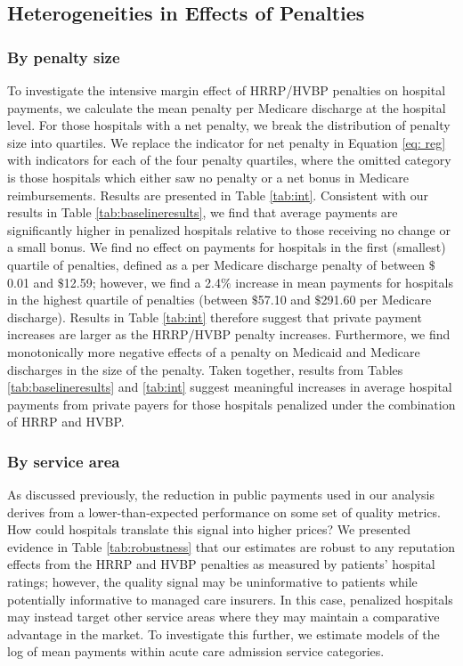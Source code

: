 \documentclass[12pt]{article}
\begin{document}
\subsection{Heterogeneities in Effects of Penalties}

\subsubsection*{By penalty size}
To investigate the intensive margin effect of HRRP/HVBP penalties on hospital payments, we calculate the mean penalty per Medicare discharge at the hospital level.  For those hospitals with a net penalty, we break the distribution of penalty size into quartiles.  We replace the indicator for net penalty in Equation \ref{eq: reg} with indicators for each of the four penalty quartiles, where the omitted category is those hospitals which either saw no penalty or a net bonus in Medicare reimbursements. Results are presented in Table \ref{tab:int}.  Consistent with our results in Table \ref{tab:baselineresults}, we find that average payments are significantly higher in penalized hospitals relative to those receiving no change or a small bonus.  We find no effect on payments for hospitals in the first (smallest) quartile of penalties, defined as a per Medicare discharge penalty of between $\$$0.01 and $\$$12.59; however, we find a 2.4$\%$ increase in mean payments for hospitals in the highest quartile of penalties (between $\$$57.10 and $\$$291.60 per Medicare discharge).  Results in Table \ref{tab:int} therefore suggest that private payment increases are larger as the HRRP/HVBP penalty increases. Furthermore, we find monotonically more negative effects of a penalty on Medicaid and Medicare discharges in the size of the penalty.  Taken together, results from Tables \ref{tab:baselineresults} and \ref{tab:int} suggest meaningful increases in average hospital payments from private payers for those hospitals penalized under the combination of HRRP and HVBP.


\subsubsection*{By service area}
As discussed previously, the reduction in public payments used in our analysis derives from a lower-than-expected performance on some set of quality metrics. How could hospitals translate this signal into higher prices? We presented evidence in Table \ref{tab:robustness} that our estimates are robust to any reputation effects from the HRRP and HVBP penalties as measured by patients' hospital ratings; however, the quality signal may be uninformative to patients while potentially informative to managed care insurers. In this case, penalized hospitals may instead target other service areas where they may maintain a comparative advantage in the market. To investigate this further, we estimate models of the log of mean payments within acute care admission service categories.
\end{document}
